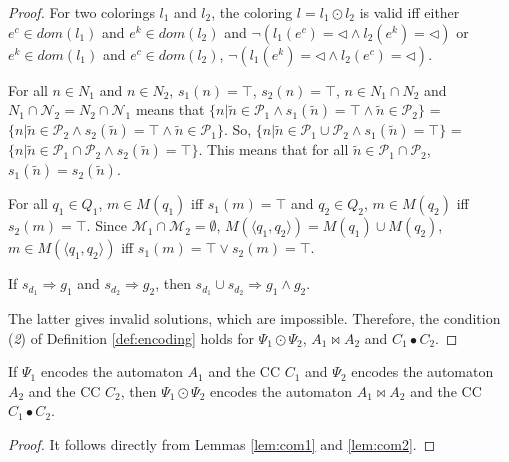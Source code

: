 \begin{proof}
\noindent
For two colorings $l_{1}$ and $l_{2}$, the coloring $l = l_1 \odot l_2$ is valid iff either $e^c \in dom(l_1)$ and $e^k \in dom(l_2)$ and $\neg (l_1(e^c) = \triangleleft \wedge l_2(e^k) = \triangleleft)$ or $e^k \in dom(l_1)$ and $e^c \in dom(l_2)$, $\neg (l_1(e^k) = \triangleleft \wedge l_2(e^c) = \triangleleft)$.

\noindent
For all $n \in N_{1}$ and $n \in N_{2}$, $s_{1}(n) = \top$, $s_{2}(n) = \top$, $n \in N_1 \cap N_2$ and $N_1 \cap \mathcal{N}_2 = N_2 \cap \mathcal{N}_1$ means that $\{n | \tilde{n} \in \mathcal{P}_1 \wedge s_1(\tilde{n}) = \top \wedge \tilde{n} \in \mathcal{P}_2 \} $ = $\{n | \tilde{n} \in \mathcal{P}_2 \wedge s_2(\tilde{n}) = \top \wedge \tilde{n} \in \mathcal{P}_1 \} $. So, $\{n | \tilde{n} \in \mathcal{P}_1 \cup \mathcal{P}_2 \wedge s_1(\tilde{n}) = \top \} $ = $\{n | \tilde{n} \in \mathcal{P}_1 \cap \mathcal{P}_2 \wedge s_2(\tilde{n}) = \top \} $. This means that for all $\tilde{n} \in \mathcal{P}_1 \cap \mathcal{P}_2$, $s_1(\tilde{n}) =  s_2(\tilde{n})$.

\noindent
For all $q_{1} \in Q_{1}$, $m \in M(q_{1})$ iff $s_{1}(m)=\top$ and  $q_{2} \in Q_{2}$, $m \in M(q_{2})$  iff $s_{2}(m)=\top$. Since $\mathcal{M}_1 \cap \mathcal{M}_2 = \emptyset$, $M(\langle q_1, q_2 \rangle) = M(q_1) \cup M(q_2)$, $m \in M(\langle q_1, q_2 \rangle)$ iff $s_1(m) = \top \vee s_2(m) = \top$.

\noindent
If $s_{d_{1}} \Rightarrow g_{1}$ and $s_{d_{2}} \Rightarrow g_{2}$, then $s_{d_1} \cup s_{d_2} \Rightarrow g_1 \wedge g_2$. 


\noindent
The latter gives invalid solutions, which are impossible. Therefore, the condition (\textit{2}) of Definition \ref{def:encoding} holds for $\Psi_1 \odot \Psi_2$, $A_1 \bowtie A_2$ and $C_1 \bullet C_2$.
\end{proof}



\begin{theorem}[Compositionality]
If $\Psi_1$ encodes the automaton $A_1$ and the CC $C_1$ and $\Psi_2$ encodes the automaton $A_2$ and the CC $C_2$, then $\Psi_1 \odot \Psi_2$ encodes the automaton $A_1 \bowtie A_2$ and the CC $C_1 \bullet C_2$.
\end{theorem}
\begin{proof}
It follows directly from Lemmas \ref{lem:com1} and \ref{lem:com2}. 
\end{proof}


